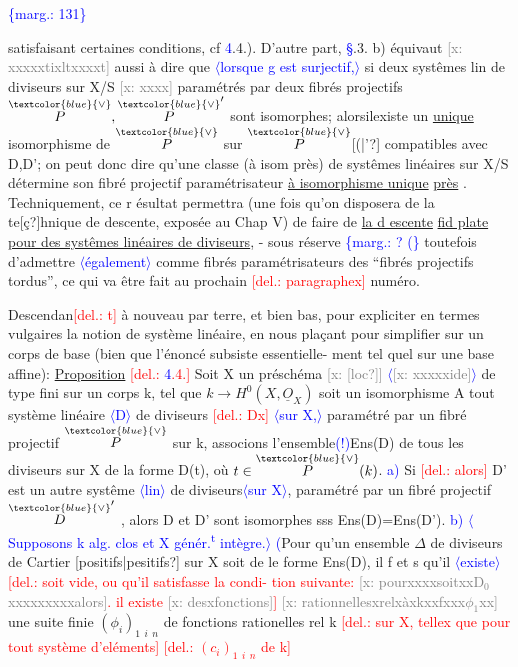 \documentclass[11pt]{article}
\newcommand{\scanpage}[1]{\par\bigskip\noindent{\small\sffamily[scan #1]}\par}
\newcommand{\mspage}[1]{{\small\sffamily[p.\,#1]}}
\newcommand{\hand}[1]{\textcolor{blue}{#1}}
\let\over\relax
\newcommand{\over}[2]{\textcolor{gray}{#1}\textcolor{blue}{\ensuremath{^{\!\nearrow}}#2}}
\newcommand{\inserted}[2][]{\textcolor{blue}{$\langle$#2$\rangle$}}
\newcommand{\margin}[1]{\textcolor{blue}{\{\textsf{marg.:} #1\}}}
\newcommand{\deleted}[1]{\textcolor{red}{[\textsf{del.:} #1]}}
\newcommand{\xout}[1]{\textcolor{gray}{[\textsf{x:} #1]}}
\newcommand{\uline}[1]{\underline{#1}}
\newcommand{\unsure}[1]{[#1?]}
\begin{document}
\margin{131}

\clearpage
\scanpage{25/132}
\mspage{35}

satisfaisant certaines conditions, cf \hand{4}.4.). D'autre part, \hand{\S}.3. b)
équivaut \xout{xxxxxtixltxxxxt} aussi à dire que \inserted[typed]{lorsque g est surjectif,} si deux systêmes lin de diviseurs
sur X/S \xout{xxxx} paramétrés par deux fibrés projectifs $\overset{\hand{\vee}}{P},\overset{\hand{\vee}}{P}'$ sont isomorphes;
alorsilexiste un \uline{unique} isomorphisme de $\overset{\hand{\vee}}{P}$ sur $\overset{\hand{\vee}}{P}$\unsure{(|'} compatibles avec D,D';
on peut donc dire qu'une classe (à isom près) de systêmes linéaires sur
X/S détermine son fibré projectif paramétrisateur \uline{à isomorphisme unique}
\uline{près} . Techniquement, ce r ésultat permettra (une fois qu'on disposera
de la te\unsure{ç}hnique de descente, exposée au Chap V) de faire de \uline{la d escente}
\uline{fid plate pour des systêmes linéaires de diviseurs}, - sous réserve
\margin{? (} toutefois d'admettre \inserted{également} comme fibrés paramétrisateurs des ``fibrés projectifs
tordus'', ce qui va être fait au prochain \deleted{paragraphex} numéro.

Descendan\deleted{t} à nouveau par terre, et bien bas, pour expliciter en
termes vulgaires la notion de système linéaire, en nous plaçant pour
simplifier sur un corps de base (bien que l'énoncé subsiste essentielle-%
ment tel quel sur une base affine):
\uline{Proposition} \deleted{\hand{4}.4.} Soit X un préschéma \xout{\unsure{loc}} \inserted[typed]{\xout{xxxxxide}} de type fini sur un corps k,
tel que $k\to H^0(X,\underline{O}_X)$ soit un isomorphisme\over{,}{.} A tout système linéaire \inserted{D} de
diviseurs \deleted{Dx} \inserted{sur X,} paramétré par un fibré projectif $\overset{\hand{\vee}}{P}$ sur k, associons
l'ensemble\hand{(!)}Ens(D) de tous les diviseurs sur X de la forme D(t), où
$t\in\overset{\hand{\vee}}{P}(k)$. \hand{a)} Si \deleted{alors} D' est un autre systême \inserted{lin} de diviseurs\inserted{sur X}, paramétré par un
fibré projectif $\overset{\hand{\vee}}{D}'$ , alors D et D' sont isomorphes sss Ens(D)=Ens(D').
\hand{b)} \inserted{Supposons k alg. clos et X génér.\textsuperscript{t} intègre.}
\hand{(}Pour qu'un ensemble $\Delta$ de diviseurs de Cartier \unsure{positifs|pesitifs} sur X soit de
le forme Ens(D), il f et s qu'il \inserted{existe} \deleted{soit vide, ou qu'il satisfasse la condi-%
tion suivante: \xout{pourxxxxsoitxxD$_0$xxxxxxxxxalors}. il existe \xout{desxfonctions}}
\xout{rationnellesxrelxàxkxxfxxx$\phi_1$xx} une suite finie $(\phi_i)_{1\ \ i\ \ n}$ de fonctions
rationelles rel k \deleted{sur X, tellex que pour tout système d'eléments}
\deleted{$(c_i)_{1\ \ i\ \ n}$ de k}
\end{document}
